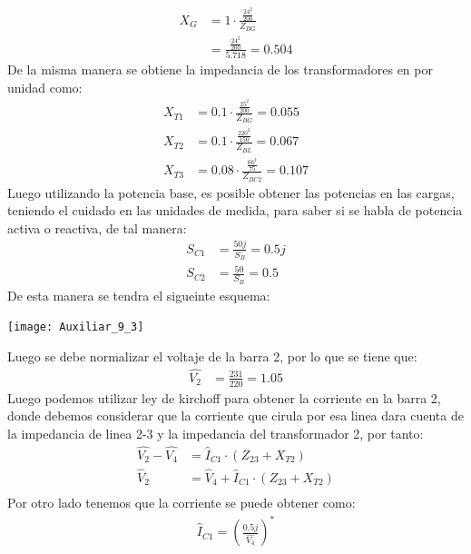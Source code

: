 \documentclass[
  11pt,
  letterpaper,
   addpoints,
   answers
  ]{exam}
\begin{document}
\begin{questions}
\begin{solution}
        \begin{align}
            X_{G} &= 1\cdot \frac{\frac{24^{2}}{200}}{Z_{BG}}\\
             &= \frac{\frac{24^{2}}{200}}{5.718} = 0.504 
        \end{align}
        De la misma manera se obtiene la impedancia de los transformadores en por unidad como:
        \begin{align}
            X_{T1} &= 0.1 \cdot \frac{\frac{25^{2}}{200}}{Z_{BG}} = 0.055\\
            X_{T2} &= 0.1 \cdot \frac{\frac{220^{2}}{150}}{Z_{BL}} = 0.067\\
            X_{T3} &= 0.08 \cdot \frac{\frac{66^{2}}{75}}{Z_{BC2}} = 0.107
        \end{align}
        Luego utilizando la potencia base, es posible obtener las potencias en las cargas, teniendo el cuidado en las unidades de medida, para saber si se habla de potencia activa o reactiva, de tal manera:
        \begin{align}
            S_{C1} &= \frac{50j}{S_{B}} = 0.5j\\
            S_{C2} &= \frac{50}{S_{B}} = 0.5
        \end{align}
        De esta manera se tendra el sigueinte esquema:
        \begin{center}
            \texttt{[image: Auxiliar\_9\_3]}
        \end{center}
        Luego se debe normalizar el voltaje de la barra 2, por lo que se tiene que:
        \begin{align}
            \hat{V_{2}} &= \frac{231}{220} = 1.05
        \end{align}
        Luego podemos utilizar ley de kirchoff para obtener la corriente en la barra 2, donde debemos considerar que la corriente que cirula por esa linea dara cuenta de la impedancia de linea 2-3 y la impedancia del transformador 2, por tanto:
        \begin{align}
            \hat{V_{2}} - \hat{V_{4}} &= \hat{I}_{C1} \cdot (Z_{23} + X_{T2})\\
            \hat{V}_{2} &= \hat{V}_{4} + \hat{I}_{C1} \cdot (Z_{23} + X_{T2})\\
        \end{align}
        Por otro lado tenemos que la corriente se puede obtener como:
        \begin{align}
            \hat{I}_{C1} = \left( \frac{0.5j}{\hat{V_{4}}}\right)^{*}
        \end{align}

\end{solution}
\end{questions}
\end{document}
